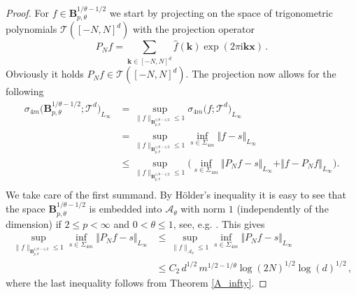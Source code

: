 \documentclass[11pt,reqno]{article}
\numberwithin{equation}{section}
\theoremstyle{definition}
\theoremstyle{plain}
\newcommand{\ca}{\ensuremath{\mathcal A}}
\newcommand{\bk}{\ensuremath{\mathbf k}}
\newcommand{\bx}{\ensuremath{\mathbf x}}
\newcommand{\be}{\begin{equation}}
\newcommand{\ee}{\end{equation}}
\begin{document}
\begin{proof} 
For \(f \in \mathbf{B}^{1/\theta-1/2}_{p,\theta}\) we start by projecting on the space of trigonometric polynomials 
$\mathcal{T}([-N,N]^d)$ with the projection operator 
\be\label{eq105}
    P_{N}f = \sum\limits_{\bk \in [-N,N]^d} \hat{f}(\bk)\exp(2\pi \mathrm{i} \bk \bx)\,.
\ee
Obviously it holds \(P_{N}f  \in \mathcal{T}([-N,N]^d)\). The projection now allows for the following 
\begin{equation}\label{f101} 
    \begin{split}
         \sigma_{4m}  \big(\mathbf{B}^{1/\theta-1/2}_{p,\theta};\mathcal{T}^d\big)_{L_\infty} 
         & = \sup_{\|f\|_{\mathbf{B}^{1/\theta-1/2}_{p,\theta}}\leq 1} \sigma_{4m}\big(f;\mathcal{T}^d\big)_{L_\infty} \\
         & = \sup_{\|f\|_{\mathbf{B}^{1/\theta-1/2}_{p,\theta}}\leq 1} \inf_{s \in \Sigma_{4m}} \Vert f - s\Vert_{L_\infty} \\
         &  \leq \sup_{\|f\|_{\mathbf{B}^{1/\theta-1/2}_{p,\theta}}\leq 1} \Big( \inf_{s \in \Sigma_{4m} } \Vert P_Nf - s\Vert_{L_\infty} + \Vert f -P_Nf\Vert_{L_\infty} \Big).\\
    \end{split}
\end{equation}
We take care of the first summand. By H\"older's inequality it is easy to see that the space $\mathbf{B}^{1/\theta-1/2}_{p,\theta}$ is embedded into $\ca_\theta$ with norm $1$ (independently of the dimension) if $2\leq p<\infty$ and $0<\theta \leq 1$, see, e.g. \cite{MSU25}. This gives
\begin{equation} \label{f102}
    \begin{split}
        \sup_{\|f\|_{\mathbf{B}^{1/\theta-1/2}_{p,\theta}}\leq 1} \inf_{s \in \Sigma_{4m} } \Vert P_Nf - s\Vert_{L_\infty}
        &\leq \sup_{\|f\|_{\ca_\theta}\leq 1} \inf_{s \in \Sigma_{4m} } \Vert P_Nf - s\Vert_{L_\infty}\\
        &\leq C_2\,d^{1/2}\, m^{1/2-1/\theta} \log(2N)^{1/2} \log(d)^{1/2}\,,
    \end{split}
\end{equation}
where the last inequality follows from Theorem \ref{A_infty}. 


\end{proof}
\end{document}
